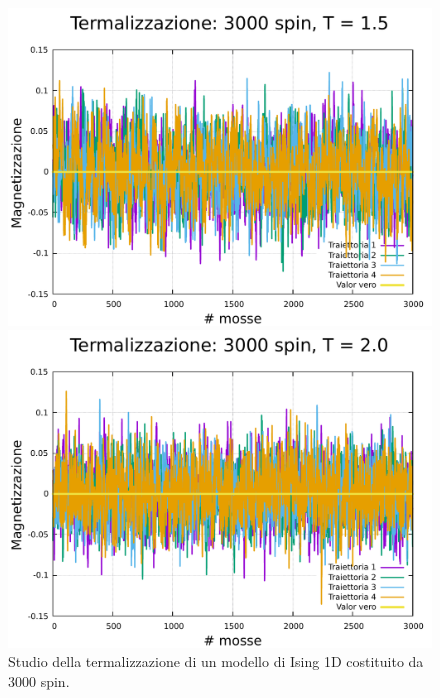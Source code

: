 \begin{figure}[htbp]
    \begin{minipage}{0.45\textwidth}  
      \centering
      \includegraphics[page=1, width=\textwidth]{Immagini/simIsing1D/magn0.0/term/term_3000_1.5.pdf}
      \caption{$T\,=\,1.5$}
    \end{minipage}\hfill
    \begin{minipage}{0.45\textwidth}  
      \centering
      \includegraphics[page=1, width=\textwidth]{Immagini/simIsing1D/magn0.0/term/term_3000_2.0.pdf}
      \caption{$T\,=\,2.0$}
    \end{minipage}
    \caption{Studio della termalizzazione di un modello di Ising 1D costituito da 3000 spin.}
\end{figure}

